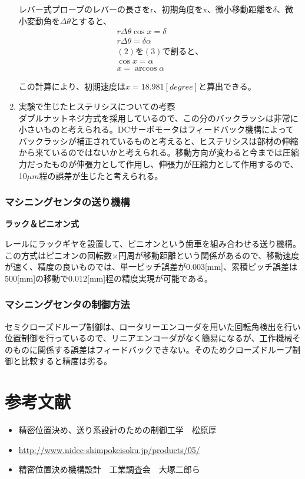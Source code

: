 \documentclass[a4j,twoside,openright,11pt]{jarticle}
\begin{document}
\begin{enumerate}
レバー式プローブのレバーの長さをr、初期角度をx、微小移動距離を$\delta$、微小変動角を$\Delta \theta$とすると、
\begin{eqnarray}
r\Delta \theta \cos x = \delta\\
r\Delta \theta = \delta \alpha\\
(2)を(3)で割ると、\nonumber\\
\cos x = \alpha\nonumber\\
x = \arccos \alpha
\end{eqnarray}

この計算により、初期速度は$x = 18.981 [degree]$と算出できる。

\item 実験で生じたヒステリシスについての考察\\
ダブルナットネジ方式を採用しているので、この分のバックラッシは非常に小さいものと考えられる。DCサーボモータはフィードバック機構によってバックラッシが補正されているものと考えると、ヒステリシスは部材の伸縮から来ているのではないかと考えられる。移動方向が変わると今までは圧縮力だったものが伸張力として作用し、伸張力が圧縮力として作用するので、10$\mu m$程の誤差が生じたと考えられる。
\end{enumerate}
\subsubsection{マシニングセンタの送り機構}
{\bf ラック＆ピニオン式}

レールにラックギヤを設置して、ピニオンという歯車を組み合わせる送り機構。この方式はピニオンの回転数$\times$円周が移動距離という関係があるので、移動速度が速く、精度の良いものでは、単一ピッチ誤差が0.003[mm]、累積ピッチ誤差は500[mm]の移動で0.012[mm]程の精度実現が可能である。
\subsubsection{マシニングセンタの制御方法}
セミクローズドループ制御は、ロータリーエンコーダを用いた回転角検出を行い位置制御を行っているので、リニアエンコーダがなく簡易になるが、工作機械そのものに関係する誤差はフィードバックできない。そのためクローズドループ制御と比較すると精度は劣る。
\section{参考文献}
\begin{itemize}
\item 精密位置決め、送り系設計のための制御工学　松原厚\\
\item \url{http://www.nidec-shimpokeisoku.jp/products/05/}\\
\item 精密位置決め機構設計　工業調査会　大塚二郎ら
\end{itemize}
\end{document}
